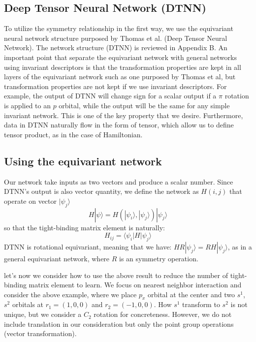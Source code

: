 \documentclass{article}
\begin{document}
\newpage

\subsection{Deep Tensor Neural Network (DTNN)}
To utilize the symmetry relationship in the first way, we use the equivariant neural network
structure purposed by Thomas et al.\cite{thomas_tensor_2018} (Deep Tensor Neural Network). 
The network structure (DTNN) is reviewed in Appendix B. 
An important point that separate the equivariant network with general networks using 
invariant descriptors is that the transformation properties are kept in all layers of the equivariant
network such as one purposed by Thomas et al, but transformation properties are not kept if we 
use invariant descriptors. For example, the output of DTNN will change sign for a scalar output  
if a $\pi$ rotation is applied to an $p$ orbital, while the output will be the same for any
simple invariant network. This is one of the key property that we desire.
Furthermore, data in DTNN naturally flow in the form of tensor, which allow us to define 
tensor product, as in the case of Hamiltonian.

\subsection{Using the equivariant network}
Our network take inputs as two vectors and produce a scalar number. Since DTNN's output is 
also vector quantity, we define the network as $H(i,j)$ that operate on vector $| \psi_j \rangle$
\begin{equation}
    H |\psi\rangle = H(| \psi_i \rangle,| \psi_j \rangle) | \psi_j \rangle
\end{equation}
so that the tight-binding matrix element is naturally:
\begin{equation}
    H_{ij} = \langle \psi_i | H | \psi_j \rangle
\end{equation}
DTNN is rotational equivariant, meaning that we have: $H R | \psi_j \rangle  = RH | \psi_j \rangle $, 
as in a general equivariant network, 
where $R$ is an symmetry operation. 

let's now we consider how to use the above result to reduce the number of 
tight-binding matrix element to learn. 
We focus on nearest neighbor interaction and consider the above example, where
we place $p_x$ orbital at the center and two $s^1$, $s^2$ orbitals at $r_1 = (1,0,0)$ and $r_2 = (-1,0,0)$. 
How $s^1$ transform to $s^2$ is not unique, but we consider a $C_2$ rotation for concreteness. 
However, we do not include translation in our consideration but only the point group 
operations (vector transformation). 
\end{document}
